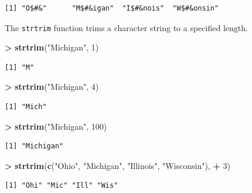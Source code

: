 \documentclass[]{krantz}
\makeatletter
\newenvironment{Shaded}{\begin{snugshade}}{\end{snugshade}}
\newcommand{\DecValTok}[1]{\textcolor[rgb]{0.06,0.06,0.06}{#1}}
\newcommand{\KeywordTok}[1]{\textcolor[rgb]{0.27,0.27,0.27}{\textbf{#1}}}
\newcommand{\NormalTok}[1]{#1}
\newcommand{\OperatorTok}[1]{\textcolor[rgb]{0.43,0.43,0.43}{\textbf{#1}}}
\newcommand{\StringTok}[1]{\textcolor[rgb]{0.5,0.5,0.5}{#1}}
\newenvironment{kframe}{%
\medskip{}
\setlength{\fboxsep}{.8em}
 \def\at@end@of@kframe{}%
 \ifinner\ifhmode%
  \def\at@end@of@kframe{\end{minipage}}%
  \begin{minipage}{\columnwidth}%
 \fi\fi%
 \def\FrameCommand##1{\hskip\@totalleftmargin \hskip-\fboxsep
 \colorbox{shadecolor}{##1}\hskip-\fboxsep
     \hskip-\linewidth \hskip-\@totalleftmargin \hskip\columnwidth}%
 \MakeFramed {\advance\hsize-\width
   \@totalleftmargin\z@ \linewidth\hsize
   \@setminipage}}%
 {\par\unskip\endMakeFramed%
 \at@end@of@kframe}
\renewenvironment{Shaded}{\begin{kframe}}{\end{kframe}}
\makeatother
\begin{document}
\begin{verbatim}
[1] "O$#&"      "M$#&igan"  "I$#&nois"  "W$#&onsin"
\end{verbatim}

The \texttt{strtrim} function trims a character string to a specified length.

\begin{Shaded}
\begin{Highlighting}[]
\OperatorTok{>}\StringTok{ }\KeywordTok{strtrim}\NormalTok{(}\StringTok{"Michigan"}\NormalTok{, }\DecValTok{1}\NormalTok{)}
\end{Highlighting}
\end{Shaded}

\begin{verbatim}
[1] "M"
\end{verbatim}

\begin{Shaded}
\begin{Highlighting}[]
\OperatorTok{>}\StringTok{ }\KeywordTok{strtrim}\NormalTok{(}\StringTok{"Michigan"}\NormalTok{, }\DecValTok{4}\NormalTok{)}
\end{Highlighting}
\end{Shaded}

\begin{verbatim}
[1] "Mich"
\end{verbatim}

\begin{Shaded}
\begin{Highlighting}[]
\OperatorTok{>}\StringTok{ }\KeywordTok{strtrim}\NormalTok{(}\StringTok{"Michigan"}\NormalTok{, }\DecValTok{100}\NormalTok{)}
\end{Highlighting}
\end{Shaded}

\begin{verbatim}
[1] "Michigan"
\end{verbatim}

\begin{Shaded}
\begin{Highlighting}[]
\OperatorTok{>}\StringTok{ }\KeywordTok{strtrim}\NormalTok{(}\KeywordTok{c}\NormalTok{(}\StringTok{"Ohio"}\NormalTok{, }\StringTok{"Michigan"}\NormalTok{, }\StringTok{"Illinois"}\NormalTok{, }\StringTok{"Wisconsin"}\NormalTok{), }
\OperatorTok{+}\StringTok{   }\DecValTok{3}\NormalTok{)}
\end{Highlighting}
\end{Shaded}

\begin{verbatim}
[1] "Ohi" "Mic" "Ill" "Wis"
\end{verbatim}
\end{document}
